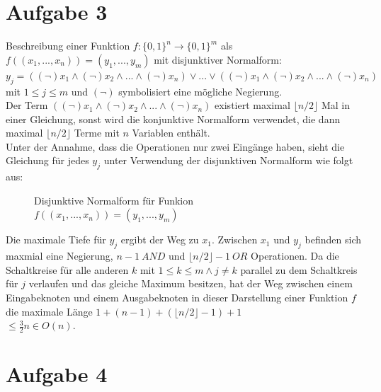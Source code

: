 \documentclass[a4paper]{scrartcl}
\begin{document}
\newpage
\section*{Aufgabe 3}

Beschreibung einer Funktion $f: \{0,1\}^n \rightarrow \{0,1\}^m$ als $f((x_1,...,x_n))=(y_1,...,y_m)$ mit disjunktiver Normalform:\\
$y_j = ((\neg) x_1 \wedge (\neg) x_2 \wedge ... \wedge (\neg) x_n ) \vee ... \vee ((\neg) x_1 \wedge (\neg) x_2 \wedge ... \wedge (\neg) x_n )$ mit $1\leq j \leq m$ und $(\neg)$ symbolisiert eine mögliche Negierung.\\
Der Term $((\neg) x_1 \wedge (\neg) x_2 \wedge ... \wedge (\neg) x_n )$ existiert maximal $\lfloor n/2 \rfloor$ Mal in einer Gleichung, sonst wird die konjunktive Normalform verwendet, die dann maximal $\lfloor n/2 \rfloor$ Terme mit $n$ Variablen enthält.\\
Unter der Annahme, dass die Operationen nur zwei Eingänge haben, sieht die Gleichung für jedes $y_j$ unter Verwendung der disjunktiven Normalform wie folgt aus:
\begin{figure}[htp] 
\caption{Disjunktive Normalform für Funkion $f((x_1,...,x_n))=(y_1,...,y_m)$}
\end{figure}

Die maximale Tiefe für $y_j$ ergibt der Weg zu $x_1$. Zwischen $x_1$ und $y_j$ befinden sich maxmial eine Negierung, $n-1~AND$ und $\lfloor n/2\rfloor -1~OR$ Operationen. Da die Schaltkreise für alle anderen $k$ mit $1\leq k\leq m \wedge j\neq k$ parallel zu dem Schaltkreis für $j$ verlaufen und das gleiche Maximum besitzen, hat der Weg zwischen einem Eingabeknoten und einem Ausgabeknoten in dieser Darstellung einer Funktion $f$ die maximale Länge $1+(n-1)+(\lfloor n/2\rfloor -1)+1$\\ $\leq \frac{3}{2} n \in O(n)$.

\newpage
\section*{Aufgabe 4}
\end{document}

